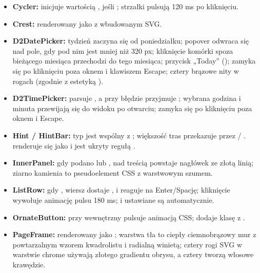 \begin{itemize}[nosep]
  \item \textbf{Cycler:}  inicjuje  wartością , jeśli ;
        strzałki pulsują 120 ms po kliknięciu.
  \item \textbf{Crest:} renderowany jako  z wbudowanym SVG.
  \item \textbf{D2DatePicker:} tydzień zaczyna się od poniedziałku; popover odwraca się nad pole, gdy pod nim
        jest mniej niż 320 px; kliknięcie komórki spoza bieżącego miesiąca przechodzi do tego miesiąca;
        przycisk „Today” (); zamyka się po kliknięciu poza oknem i klawiszem Escape; cztery
        brązowe nity w rogach (zgodnie z estetyką ).
  \item \textbf{D2TimePicker:} parsuje , a przy błędzie przyjmuje ; wybrana godzina i
        minuta przewijają się do widoku po otwarciu; zamyka się po kliknięciu poza oknem i Escape.
  \item \textbf{Hint / HintBar:} typ  jest wspólny z ; większość tras
        przekazuje  przez  / .
         renderuje się jako  i jest ukryty regułą
        .
  \item \textbf{InnerPanel:} gdy podano  lub , nad treścią powstaje nagłówek ze
        złotą linią; ziarno kamienia to pseudoelement CSS z warstwowym szumem.
  \item \textbf{ListRow:} gdy , wiersz dostaje
        ,  i reaguje na Enter/Spację; kliknięcie wywołuje animację
        pulsu 180 ms;  i  ustawiane są automatycznie.
  \item \textbf{OrnateButton:} przy  wewnętrzny  pulsuje animacją CSS;
         dodaje klasę z .
  \item \textbf{PageFrame:} renderowany jako ; warstwa tła to
        ciepły ciemnobrązowy mur z powtarzalnym wzorem kwadrolistu i radialną winietą; cztery rogi SVG
        w warstwie chrome używają złotego gradientu obrysu, a cztery  tworzą włosowe krawędzie.

\end{itemize}
